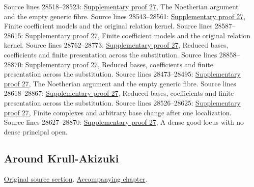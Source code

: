 \begin{AlgebraSourceRoutes}
 Source lines 28518--28523: \hyperlink{algebra_generic_freeness_notes_20260928}{Supplementary proof 27}, The Noetherian argument and the empty generic fibre.
 Source lines 28543--28561: \hyperlink{algebra_generic_freeness_notes_20260928}{Supplementary proof 27}, Finite coefficient models and the original relation kernel.
 Source lines 28587--28615: \hyperlink{algebra_generic_freeness_notes_20260928}{Supplementary proof 27}, Finite coefficient models and the original relation kernel.
 Source lines 28762--28773: \hyperlink{algebra_generic_freeness_notes_20260928}{Supplementary proof 27}, Reduced bases, coefficients and finite presentation across the substitution.
 Source lines 28858--28870: \hyperlink{algebra_generic_freeness_notes_20260928}{Supplementary proof 27}, Reduced bases, coefficients and finite presentation across the substitution.
 Source lines 28473--28495: \hyperlink{algebra_generic_freeness_notes_20260928}{Supplementary proof 27}, The Noetherian argument and the empty generic fibre.
 Source lines 28618--28867: \hyperlink{algebra_generic_freeness_notes_20260928}{Supplementary proof 27}, Reduced bases, coefficients and finite presentation across the substitution.
 Source lines 28526--28625: \hyperlink{algebra_generic_freeness_notes_20260928}{Supplementary proof 27}, Finite complexes and arbitrary base change after one localization.
 Source lines 28627--28870: \hyperlink{algebra_generic_freeness_notes_20260928}{Supplementary proof 27}, A dense good locus with no dense principal open.
\end{AlgebraSourceRoutes}

\subsection{Around Krull-Akizuki}
\hypertarget{algebra-source-section-krull-akizuki}{}
\noindent\href{https://github.com/stacks/stacks-project/blob/a04446e57ec1fbc252a871afcec7752fb2807b14/algebra.tex\#L28877}{Original source section}. \href{algebra.pdf\#nameddest=section-krull-akizuki}{Accompanying chapter}.

